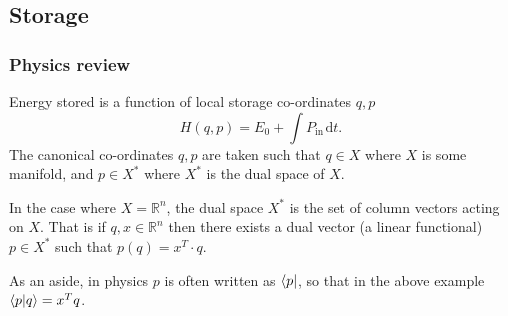 \documentclass[11pt,reqno]{beamer}
\newcommand{\df}[1]{\mspace{2mu}  \mathrm{d}#1}
\begin{document}
\subsection{Storage}
\begin{frame}
\frametitle{Physics review}
Energy stored is a function of local storage co-ordinates $q,p$
\[
H(q, p) = E_0 + \int P_\text{in}\df{t}.
\]
The canonical co-ordinates $q, p$ are taken such that $q \in X$ where $X$ is some manifold, and $p\in X^*$ where $X^*$ is the dual space of $X$. 
\vspace{10pt}

In the case where $X = \mathbb{R}^n$, the dual space $X^*$ is the set of column vectors acting on $X$.
That is if $q,x \in \mathbb{R}^n$ then there exists a dual vector (a linear functional) $p \in X^*$ such that $p(q) = x^T\cdot q$.

\vspace{10pt}

As an aside, in physics $p$ is often written as $\bra{p}$, so that in the above example $\bra{p}\ket{q} = x^Tq$.
\end{frame}
\end{document}

